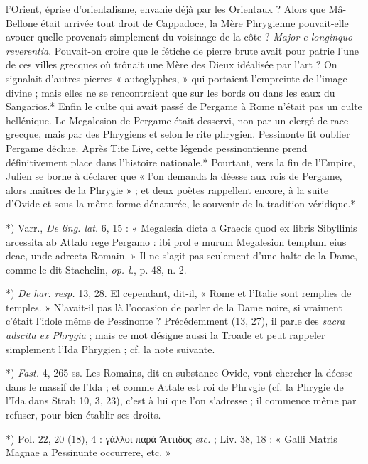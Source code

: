 \documentclass[a4paper, 11pt, oneside, polutonikogreek, french]{article}
\begin{document}
l'Orient, éprise d'orientalisme, envahie déjà par les Orientaux ? Alors que Mâ-Bellone était arrivée tout droit de Cappadoce, la Mère Phrygienne pouvait-elle avouer quelle provenait simplement du voisinage de la côte ? \emph{Major e longinquo reverentia}. Pouvait-on croire que le fétiche de pierre brute avait pour patrie l'une de ces villes grecques où trônait une Mère des Dieux idéalisée par l'art ? On signalait d'autres pierres « autoglyphes, » qui portaient l'empreinte de l'image divine ; mais elles ne se rencontraient que sur les bords ou dans les eaux du Sangarios.* Enfin le culte qui avait passé de Pergame à Rome n'était pas un culte hellénique. Le Megalesion de Pergame était desservi, non par un clergé de race grecque, mais par des Phrygiens et selon le rite phrygien. Pessinonte fit oublier Pergame déchue. Après Tite Live, cette légende pessinontienne prend définitivement place dans l'histoire nationale.* Pourtant, vers la fin de l'Empire, Julien se borne à déclarer que « l'on demanda la déesse aux rois de Pergame, alors maîtres de la Phrygie » ; et deux poètes rappellent encore, à la suite d'Ovide et sous la même forme dénaturée, le souvenir de la tradition véridique.*

*) Varr., \emph{De ling. lat.} 6, 15 : « Megalesia dicta a Graecis quod ex libris Sibyllinis arcessita ab Attalo rege Pergamo : ibi prol e murum Megalesion templum eius deae, unde adrecta Romain. » Il ne s'agit pas seulement d'une halte de la Dame, comme le dit Staehelin, \emph{op. l.}, p. 48, n. 2.

*) \emph{De har. resp.} 13, 28. El cependant, dit-il, « Rome et l'Italie sont remplies de temples. » N'avait-il pas là l'occasion de parler de la Dame noire, si vraiment c'était l'idole même de Pessinonte ? Précédemment (13, 27), il parle des \emph{sacra adscita ex Phrygia} ; mais ce mot désigne aussi la Troade et peut rappeler simplement l'Ida Phrygien ; cf. la note suivante.

*) \emph{Fast.} 4, 265 ss. Les Romains, dit en substance Ovide, vont chercher la déesse dans le massif de l'Ida ; et comme Attale est roi de Phrvgie (cf. la Phrygie de l'Ida dans Strab 10, 3, 23), c'est à lui que l'on s'adresse ; il commence même par refuser, pour bien établir ses droits.

*) Pol. 22, 20 (18), 4 : γάλλοι παρὰ Ἄττιδος \emph{etc.} ; Liv. 38, 18 : « Galli Matris Magnae a Pessinunte occurrere, etc. »
\end{document}
